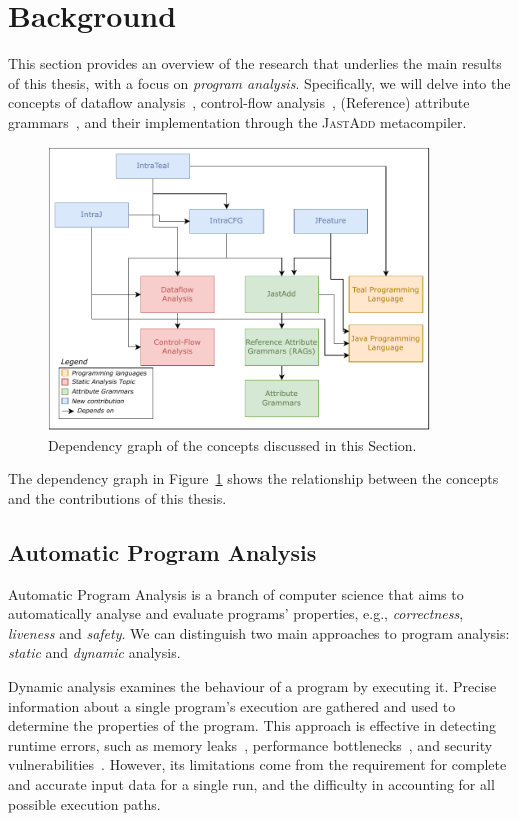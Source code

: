 \section{Background}%
\label{sec:background}
This section provides an overview of the research that underlies the main results
of this thesis, with a focus on \emph{program analysis}. Specifically, we will delve into
the concepts of dataflow analysis~\cite{aho2007compilers,Nielson2010Principles},
control-flow analysis~\cite{allen1970control}, (Reference) attribute grammars~\cite{knuth1968semantics, DBLP:journals/informaticaSI/Hedin00},
and their implementation through the \textsc{JastAdd} metacompiler.

\usetikzlibrary{backgrounds}
\begin{figure}[h]
    \centering
    \includegraphics[width=0.9\textwidth]{kappa/img/Dependencies.pdf}
  \caption{\label{fig:dependencygraph}Dependency graph of the concepts discussed in this Section.}
\end{figure}
The dependency graph in Figure~\ref{fig:dependencygraph} shows the relationship between
the concepts and the contributions of this thesis.

\subsection{Automatic Program Analysis}
Automatic Program Analysis is a branch of computer science that aims to automatically
analyse and evaluate programs' properties, e.g., \emph{correctness}, \emph{liveness} and \emph{safety}. We can distinguish two main
approaches to program analysis: \emph{static} and \emph{dynamic} analysis.

Dynamic analysis examines the behaviour of a program by executing it.
Precise information about a single program's execution are gathered
and used to determine the properties of the program.
This approach is effective in detecting runtime errors, such as memory leaks~\cite{Valgrind},
performance bottlenecks~\cite{VTune}, and security vulnerabilities~\cite{li2018fuzzing}.
However, its limitations come from the requirement for complete and
accurate input data for a single run, and the difficulty in accounting for
all possible execution paths.

